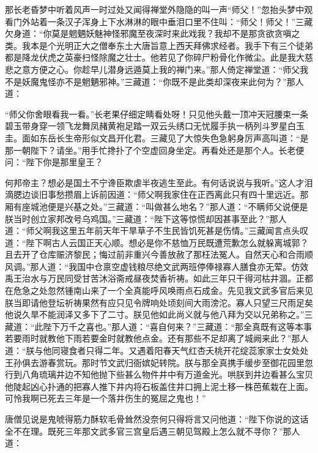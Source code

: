 \documentclass[12pt,UTF8]{ctexbook}
\begin{document}
那长老昏梦中听着风声一时过处又闻得禅堂外隐隐的叫一声“师父！”忽抬头梦中观看门外站着一条汉子浑身上下水淋淋的眼中垂泪口里不住叫：“师父！师父！”三藏欠身道：“你莫是魍魉妖魅神怪邪魔至夜深时来此戏我？我却不是那贪欲贪嗔之类。我本是个光明正大之僧奉东土大唐旨意上西天拜佛求经者。我手下有三个徒弟都是降龙伏虎之英豪扫怪除魔之壮士。他若见了你碎尸粉骨化作微尘。此是我大慈悲之意方便之心。你趁早儿潜身远遁莫上我的禅门来。”那人倚定禅堂道：“师父我不是妖魔鬼怪亦不是魍魉邪神。”三藏道：“你既不是此类却深夜来此何为？”那人道：

“师父你舍眼看我一看。”长老果仔细定睛看处呀！只见他头戴一顶冲天冠腰束一条碧玉带身穿一领飞龙舞凤赭黄袍足踏一双云头绣口无忧履手执一柄列斗罗星白玉圭。面如东岳长生帝形似文昌开化君。三藏见了大惊失色急躬身厉声高叫道：“是那一朝陛下？请坐。”用手忙搀扑了个空虚回身坐定。再看处还是那个人。长老便问：“陛下你是那里皇王？

何邦帝主？想必是国土不宁谗臣欺虐半夜逃生至此。有何话说说与我听。”这人才泪滴腮边谈旧事愁攒眉上诉前因道：“师父啊我家住在正西离此只有四十里远近。那厢有座城池便是兴基之处。”三藏道：“叫做甚么地名？”那人道：“不瞒师父说便是朕当时创立家邦改号乌鸡国。”三藏道：“陛下这等惊慌却因甚事至此？”那人道：“师父啊我这里五年前天年干旱草子不生民皆饥死甚是伤情。”三藏闻言点头叹道：“陛下啊古人云国正天心顺。想必是你不慈恤万民既遭荒歉怎么就躲离城郭？且去开了仓库赈济黎民；悔过前非重兴今善放赦了那枉法冤人。自然天心和合雨顺风调。”那人道：“我国中仓禀空虚钱粮尽绝文武两班停俸禄寡人膳食亦无荤。仿效禹王治水与万民同受甘苦沐浴斋戒昼夜焚香祈祷。如此三年只干得河枯井涸。正都在危急之处忽然锺南山来了一个全真能呼风唤雨点石成金。先见我文武多官后来见朕当即请他登坛祈祷果然有应只见令牌响处顷刻间大雨滂沱。寡人只望三尺雨足矣他说久旱不能润泽又多下了二寸。朕见他如此尚义就与他八拜为交以兄弟称之。”三藏道：“此陛下万千之喜也。”那人道：“喜自何来？”三藏道：“那全真既有这等本事若要雨时就教他下雨若要金时就教他点金。还有那些不足却离了城阙来此？”那人道：“朕与他同寝食者只得二年。又遇着阳春天气红杏夭桃开花绽蕊家家士女处处王孙俱去游春赏玩。那时节文武归衙嫔妃转院。朕与那全真携手缓步至御花园里忽行到八角琉璃井边不知他抛下些甚么物件井中有万道金光。哄朕到井边看甚么宝贝他陡起凶心扑通的把寡人推下井内将石板盖住井口拥上泥土移一株芭蕉栽在上面。可怜我啊已死去三年是一个落井伤生的冤屈之鬼也！”

唐僧见说是鬼唬得筋力酥软毛骨耸然没奈何只得将言又问他道：“陛下你说的这话全不在理。既死三年那文武多官三宫皇后遇三朝见驾殿上怎么就不寻你？”那人道：
\end{document}
